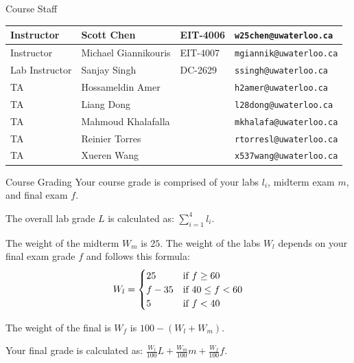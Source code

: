 \documentclass[aspectratio=169]{beamer}
\begin{document}
	\begin{frame}{Course Staff}
		\begin{center}
		\begin{footnotesize}
		\begin{tabular}{l|l|l|l}
        Instructor & Scott Chen & EIT-4006 & \texttt{w25chen@uwaterloo.ca} \\
        \hline
        Instructor & Michael Giannikouris & EIT-4007 & \texttt{mgiannik@uwaterloo.ca} \\
        \hline
        Lab Instructor & Sanjay Singh & DC-2629 & \texttt{ssingh@uwaterloo.ca}\\
        \hline
        TA & Hossameldin Amer &  & \texttt{h2amer@uwaterloo.ca} \\
        TA & Liang Dong &  & \texttt{l28dong@uwaterloo.ca} \\
        TA & Mahmoud Khalafalla &  & \texttt{mkhalafa@uwaterloo.ca} \\
        TA & Reinier Torres & & \texttt{rtorresl@uwaterloo.ca} \\
        TA & Xueren Wang & & \texttt{x537wang@uwaterloo.ca} \\
        \end{tabular}
        \end{footnotesize}
		\end{center}
	\end{frame}
	
	
	
\begin{frame}{Course Grading}
Your course grade is comprised of your labs $l_{i}$, midterm exam $m$, and final exam $f$.

The overall lab grade $L$ is calculated as: $\sum_{i=1}^{4}l_{i}$.

The weight of the midterm $W_{m}$ is $25$. The weight of the labs $W_{l}$ depends on your final exam grade $f$ and follows this formula:
\[
 W_{l} = \begin{cases}
        25      & $if~$ f \ge 60\\
        f - 35  & $if~$ 40 \le f < 60\\
        5       & $if~$ f < 40
        \end{cases}
\]

The weight of the final is $W_{f}$ is $100 - (W_{l} + W_{m})$.

Your final grade is calculated as: $\frac{W_{l}}{100}L + \frac{W_{m}}{100}m + \frac{W_{f}}{100}f $.
\end{frame}
	
\end{document}
